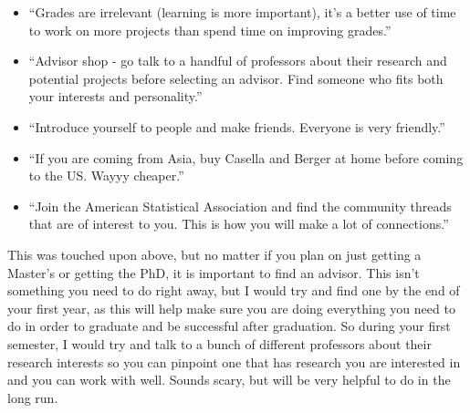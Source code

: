\documentclass[
  12pt,
]{book}
\begin{document}
\begin{itemize}
\item
  ``Grades are irrelevant (learning is more important), it's a better use of time to work on more projects than spend time on improving grades.''
\item
  ``Advisor shop - go talk to a handful of professors about their research and potential projects before selecting an advisor. Find someone who fits both your interests and personality.''
\item
  ``Introduce yourself to people and make friends. Everyone is very friendly.''
\item
  ``If you are coming from Asia, buy Casella and Berger at home before coming to the US. Wayyy cheaper.''
\item
  ``Join the American Statistical Association and find the community threads that are of interest to you. This is how you will make a lot of connections.''
\end{itemize}

This was touched upon above, but no matter if you plan on just getting a Master's or getting the PhD, it is important to find an advisor. This isn't something you need to do right away, but I would try and find one by the end of your first year, as this will help make sure you are doing everything you need to do in order to graduate and be successful after graduation. So during your first semester, I would try and talk to a bunch of different professors about their research interests so you can pinpoint one that has research you are interested in and you can work with well. Sounds scary, but will be very helpful to do in the long run.
\end{document}
